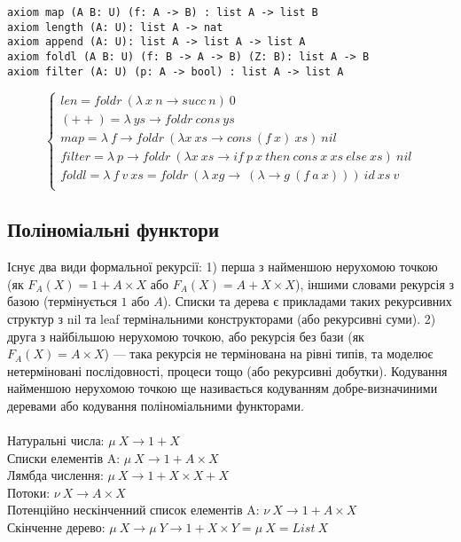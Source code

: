 \begin{lstlisting}[mathescape=true]
axiom map (A B: U) (f: A -> B) : list A -> list B
axiom length (A: U): list A -> nat
axiom append (A: U): list A -> list A -> list A
axiom foldl (A B: U) (f: B -> A -> B) (Z: B): list A -> B
axiom filter (A: U) (p: A -> bool) : list A -> list A
\end{lstlisting}

$$
\begin{cases}
len = foldr\ (\lambda\ x\ n \rightarrow succ\ n)\ 0\\
(++) = \lambda\ ys \rightarrow foldr\ cons\ ys\\
map = \lambda\ f \rightarrow foldr\ (\lambda x\ xs \rightarrow cons\ (f\ x)\ xs)\ nil\\
filter = \lambda\ p \rightarrow foldr\ (\lambda x\ xs \rightarrow if\ p\ x\ then\ cons\ x\ xs\ else\ xs)\ nil\\
foldl = \lambda\ f\ v\ xs = foldr\ (\lambda\ xg\rightarrow\ (\lambda \rightarrow g\ (f\ a\ x)))\ id\ xs\ v\\
\end{cases}
$$

\newpage
\subsection{Поліноміальні функтори}
Існує два види формальної рекурсії: 1) перша з найменшою нерухомою точкою
(як $F_A(X) = 1 + A \times X$ або $F_A(X) = A + X \times X$), іншими словами
рекурсія з базою (термінується $1$ або $A$). Списки та дерева є
прикладами таких рекурсивних структур з nil та leaf термінальними
конструкторами (або рекурсивні суми).
2) друга з найбільшою нерухомою точкою, або рекурсія без бази
(як $F_A(X) = A \times X$) --- така рекурсія не термінована на рівні типів,
та моделює нетерміновані послідовності, процеси тощо (або рекурсивні добутки).
Кодування найменшою нерухомою точкою ще називається кодуванням
добре-визначиними деревами або кодування поліноміальними функторами.
\\
\\
\noindent Натуральні числа: $\mu\ X \rightarrow 1 + X$\\
Списки елементів A: $\mu\ X \rightarrow 1 + A \times X$\\
Лямбда числення: $\mu\ X \rightarrow 1 + X \times X + X$\\
Потоки: $\nu\ X \rightarrow A \times X$\\
Потенційно нескінченний список елементів A: $\nu\ X \rightarrow 1 + A \times X$\\
Скінченне дерево: $\mu\ X \rightarrow \mu\ Y \rightarrow 1 + X \times Y = \mu\ X = List\ X$\\

